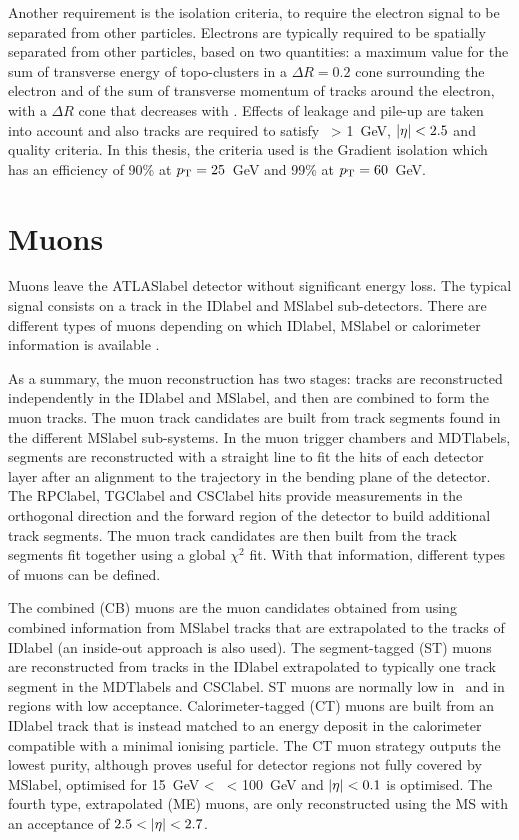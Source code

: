 Another requirement is the isolation criteria, to require the electron signal to be separated from other particles. Electrons are typically required to be spatially separated from other particles, based on two quantities: a maximum value for the sum of transverse energy of topo-clusters in a $\Delta R=0.2$ cone surrounding the electron and of the sum of transverse momentum of tracks around the electron, with a $\Delta R$ cone that decreases with \pT. Effects of leakage and pile-up are taken into account and also tracks are required to satisfy \pT\ > 1~GeV, $\abs{\eta}<2.5$ and quality criteria. In this thesis, the criteria used is the Gradient isolation which has an efficiency of 90\% at $p_{\text{T}} = 25$~GeV and 99\% at $p_{\text{T}} = 60$~GeV.

\section{Muons}

Muons leave the \acrshort{ATLASlabel} detector without significant energy loss. The typical signal consists on a track in the \acrshort{IDlabel} and \acrshort{MSlabel} sub-detectors. There are different types of muons depending on which \acrshort{IDlabel}, \acrshort{MSlabel} or calorimeter information is available %
.

As a summary, the muon reconstruction has two stages: tracks are reconstructed independently in the \acrshort{IDlabel} and \acrshort{MSlabel}, and then are combined to form the muon tracks. The muon track candidates are built from track segments found in the different \acrshort{MSlabel} sub-systems. In the muon trigger chambers and \acrshort{MDTlabel}s, segments are reconstructed with a straight line to fit the hits of each detector layer after an alignment to the trajectory in the bending plane of the detector. The \acrshort{RPClabel}, \acrshort{TGClabel} and \acrshort{CSClabel} hits provide measurements in the orthogonal direction and the forward region of the detector to build additional track segments. The muon track candidates are then built from the track segments fit together using a global $\chi^2$ fit. With that information, different types of muons can be defined.

The combined (CB) muons are the muon candidates obtained from using combined information from \acrshort{MSlabel} tracks that are extrapolated to the tracks of \acrshort{IDlabel} (an inside-out approach is also used). The segment-tagged (ST) muons are reconstructed from tracks in the \acrshort{IDlabel} extrapolated to typically one track segment in the \acrshort{MDTlabel}s and \acrshort{CSClabel}. ST muons are normally low in \pT\ and in regions with low acceptance. Calorimeter-tagged (CT) muons are built from an \acrshort{IDlabel} track that is instead matched to an energy deposit in the calorimeter compatible with a minimal ionising particle. The CT muon strategy outputs the lowest purity, although proves useful for detector regions not fully covered by \acrshort{MSlabel}, optimised for 15~GeV < \pT\ < 100~GeV and $\abs{\eta}<0.1$ is optimised. The fourth type, extrapolated (ME) muons, are only reconstructed using the \acrshort{MS} with an acceptance of $2.5 < \abs{\eta} < 2.7$.

